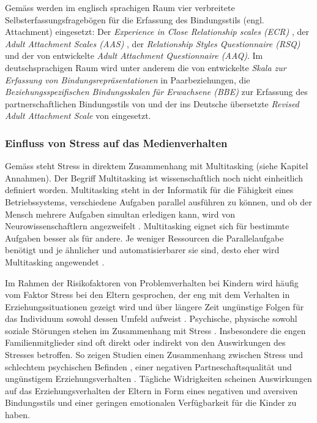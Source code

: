 Gemäss  werden im englisch sprachigen Raum vier verbreitete Selbsterfassungsfragebögen für die Erfassung des Bindungsstils (engl. Attachment) eingesetzt: Der \textit{
Experience in Close Relationship scales (ECR)} \cite{Brennan1998}, der \textit{Adult Attachment Scales (AAS)} \cite{Collins1990}, der \textit{Relationship Styles Questionnaire (RSQ)} \cite{Griffin1994} und der von  entwickelte \textit{Adult Attachment Questionnaire (AAQ)}. Im deutschsprachigen Raum wird unter anderem die von  entwickelte \textit{Skala zur Erfassung von Bindungsrepräsentationen} in Paarbeziehungen, die \textit{Beziehungsspezifischen Bindungsskalen für Erwachsene (BBE)} zur Erfassung des partnerschaftlichen Bindungsstils von  und der ins Deutsche übersetzte \textit{Revised Adult Attachment Scale} von  eingesetzt. 

\subsubsection{Einfluss von Stress auf das Medienverhalten}
Gemäss  steht Stress in direktem Zusammenhang mit Multitasking (siehe Kapitel Annahmen). Der Begriff Multitasking ist wissenschaftlich noch nicht einheitlich definiert worden. Multitasking steht in der Informatik für die Fähigkeit eines Betriebssystems, verschiedene Aufgaben parallel ausführen zu können, und ob der Mensch mehrere Aufgaben simultan erledigen kann, wird von Neurowissenschaftlern angezweifelt \cite{Zimber2016}. Multitasking eignet sich für bestimmte Aufgaben besser als für andere. Je weniger Ressourcen die Parallelaufgabe benötigt und je ähnlicher und automatisierbarer sie sind, desto eher wird Multitasking angewendet \cite[S.~10]{Zimber2016}.

Im Rahmen der Risikofaktoren von Problemverhalten bei Kindern wird häufig vom Faktor Stress bei den Eltern gesprochen, der eng mit dem Verhalten in Erziehungssituationen gezeigt wird und über längere Zeit ungünstige Folgen für das Individuum sowohl dessen Umfeld aufweist \cite{Cina2009}. Psychische, physische sowohl soziale Störungen stehen im Zusammenhang mit Stress \cite{Elfering2002, Burisch1994}. Insbesondere die engen Familienmitglieder sind oft direkt oder indirekt von den Auswirkungen des Stresses betroffen. So zeigen Studien einen Zusammenhang zwischen Stress und schlechtem psychischen Befinden \cite{Burisch1994, Krohne1997}, einer negativen Partneschaftsqualität \cite{Bodenmann2000, Bodenmann1999, Bodenmann2000a} und ungünstigem Erziehungsverhalten \cite{Abidin1992, Belsky1984, WebsterStratton2000}. Tägliche Widrigkeiten scheinen Auswirkungen auf das Erziehungsverhalten der Eltern in Form eines negativen und aversiven Bindungsstils \cite{Dumas1989, Webster-Stratton1988} und einer geringen emotionalen Verfügbarkeit für die Kinder \cite{Campbell1991} zu haben.

